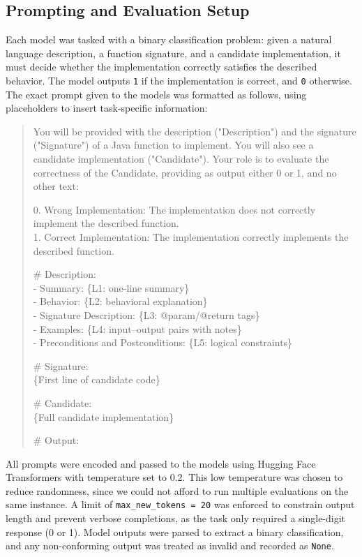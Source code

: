 \documentclass[a4paper]{usiinfbachelorproject}
\begin{document}
\subsection{Prompting and Evaluation Setup}\label{sec:evaluation}
Each model was tasked with a binary classification problem: given a natural language description, a function signature, and a candidate implementation, it must decide whether the implementation correctly satisfies the described behavior. The model outputs \texttt{1} if the implementation is correct, and \texttt{0} otherwise.
The exact prompt given to the models was formatted as follows, using placeholders to insert task-specific information:

\begin{quote}\ttfamily
You will be provided with the description ("Description") and the signature ("Signature") of a Java function to implement. You will also see a candidate implementation ("Candidate"). Your role is to evaluate the correctness of the Candidate, providing as output either 0 or 1, and no other text:

0. Wrong Implementation: The implementation does not correctly implement the described function.\\
1. Correct Implementation: The implementation correctly implements the described function.

\# Description:\\
- Summary: \{L1: one-line summary\}\\
- Behavior: \{L2: behavioral explanation\}\\
- Signature Description: \{L3: @param/@return tags\}\\
- Examples: \{L4: input–output pairs with notes\}\\
- Preconditions and Postconditions: \{L5: logical constraints\}

\# Signature:\\
\{First line of candidate code\}

\# Candidate:\\
\{Full candidate implementation\}

\# Output:
\end{quote}
All prompts were encoded and passed to the models using Hugging Face Transformers with temperature set to 0.2. This low temperature was chosen to reduce randomness, since we could not afford to run multiple evaluations on the same instance. A limit of \texttt{max\_new\_tokens = 20} was enforced to constrain output length and prevent verbose completions, as the task only required a single-digit response (0 or 1). Model outputs were parsed to extract a binary classification, and any non-conforming output was treated as invalid and recorded as \texttt{None}.\\
\end{document}
